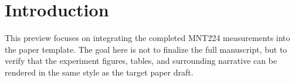 \section{Introduction}
This preview focuses on integrating the completed MNT224 measurements into the paper template. The goal here is not to finalize the full manuscript, but to verify that the experiment figures, tables, and surrounding narrative can be rendered in the same style as the target paper draft.
